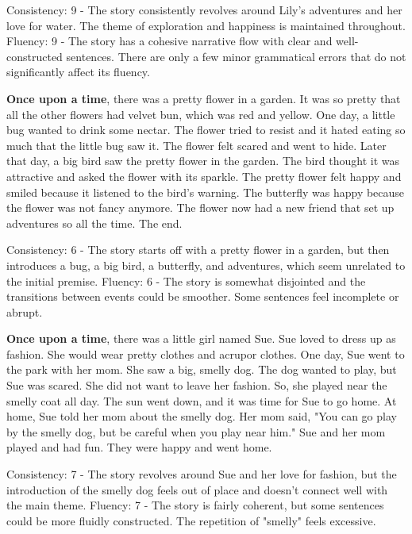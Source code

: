 \documentclass{article}
\begin{document}
Consistency: 9 - The story consistently revolves around Lily's adventures and her love for water. The theme of exploration and happiness is maintained throughout.
Fluency: 9 - The story has a cohesive narrative flow with clear and well-constructed sentences. There are only a few minor grammatical errors that do not significantly affect its fluency.

\textbf{Once upon a time}, there was a pretty flower in a garden. It was so pretty that all the other flowers had velvet bun, which was red and yellow. One day, a little bug wanted to drink some nectar. The flower tried to resist and it hated eating so much that the little bug saw it. The flower felt scared and went to hide. Later that day, a big bird saw the pretty flower in the garden. The bird thought it was attractive and asked the flower with its sparkle. The pretty flower felt happy and smiled because it listened to the bird's warning. The butterfly was happy because the flower was not fancy anymore. The flower now had a new friend that set up adventures so all the time. The end.

Consistency: 6 - The story starts off with a pretty flower in a garden, but then introduces a bug, a big bird, a butterfly, and adventures, which seem unrelated to the initial premise.
Fluency: 6 - The story is somewhat disjointed and the transitions between events could be smoother. Some sentences feel incomplete or abrupt.

\textbf{Once upon a time}, there was a little girl named Sue. Sue loved to dress up as fashion. She would wear pretty clothes and acrupor clothes. One day, Sue went to the park with her mom. She saw a big, smelly dog. The dog wanted to play, but Sue was scared. She did not want to leave her fashion. So, she played near the smelly coat all day. The sun went down, and it was time for Sue to go home. At home, Sue told her mom about the smelly dog. Her mom said, "You can go play by the smelly dog, but be careful when you play near him." Sue and her mom played and had fun. They were happy and went home.

Consistency: 7 - The story revolves around Sue and her love for fashion, but the introduction of the smelly dog feels out of place and doesn't connect well with the main theme.
Fluency: 7 - The story is fairly coherent, but some sentences could be more fluidly constructed. The repetition of "smelly" feels excessive.
\end{document}
